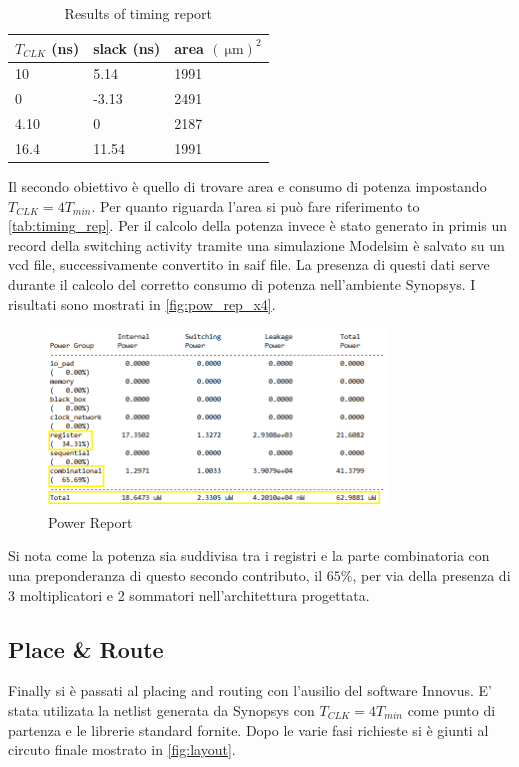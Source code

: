\begin{table}[h]
\begin{center}
\begin{tabular}{|l|l|l|}
\hline
$T_{CLK}$ (ns) & slack (ns) & area $(\SI{}{\micro\meter})^2$ \\
\hline
10 & 5.14 & 1991 \\
0 & -3.13 & 2491 \\
4.10 & 0 & 2187 \\
16.4 & 11.54 & 1991 \\
\hline
\end{tabular}
\end{center}
\caption{Results of timing report}
\label{tab:timing_rep}
\end{table}

Il secondo obiettivo è quello di trovare area e consumo di potenza impostando $T_{CLK} = 4 T_{min}$. Per quanto riguarda l'area si può fare riferimento to \autoref{tab:timing_rep}. Per il calcolo della potenza invece è stato generato in primis un record della switching activity tramite una simulazione Modelsim è salvato su un vcd file, successivamente convertito in saif file. La presenza di questi dati serve durante il calcolo del corretto consumo di potenza nell'ambiente Synopsys. I risultati sono mostrati in \autoref{fig:pow_rep_x4}.

\begin{figure}[htb]
	\center
	\includegraphics[width=0.8\textwidth]{images/rep_power_x4_mod.png}
	\caption{Power Report}
	\label{fig:pow_rep_x4}
\end{figure}

Si nota come la potenza sia suddivisa tra i registri e la parte combinatoria con una preponderanza di questo secondo contributo, il $65\%$, per via della presenza di 3 moltiplicatori e 2 sommatori nell'architettura progettata.

\subsection{Place \& Route}
Finally si è passati al placing and routing con l'ausilio del software Innovus. E' stata utilizata la netlist generata da Synopsys con $T_{CLK} = 4 T_{min}$ come punto di partenza e le librerie standard fornite. Dopo le varie fasi richieste si è giunti al circuto finale mostrato in \autoref{fig:layout}.

